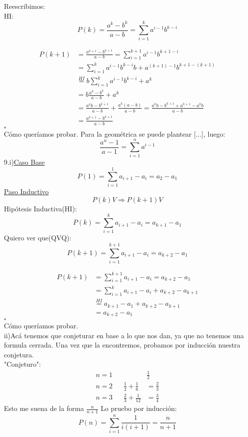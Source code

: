 \documentclass[a4paper,11pt]{article}
\begin{document}
Reescribimos:\\
HI: \[ P(k) = \frac{a^{k} - b^{k}}{a-b} = \sum_{i=1}^{k} a^{i-1}b^{k-i} \]


\begin{equation} 
\begin{split}
P(k+1) & = \frac{a^{k+1} - b^{k+1}}{a-b} = \sum_{i=1}^{k+1}a^{i-1}b^{k+1-i} \\
 &  = \sum_{i=1}^{k}a^{i-1}b^{k-i}b+a^{(k+1)-1}b^{k+1-(k+1)} \\
 & \stackrel{HI}{=} b\sum_{i=1}^{k}a^{i-1}b^{k-i}+a^{k} \\
 & = b \frac{a^{k} - b^{k}}{a-b} +a^{k} \\
 & = \frac{a^{k}b - b^{k+1}}{a-b} +\frac{a^{k}(a-b)}{a-b} = \frac{a^{k}b - b^{k+1}+a^{k+1}-a^{k}b}{a-b} \\
 & = \frac{a^{k+1}- b^{k+1}}{a-b}
\end{split}
\end{equation}
\hfill$\square $\\
Cómo queríamos probar. Para la geométrica se puede plantear [...], luego:\\
 \[ \frac{a^{n} - 1}{a-1} = \sum_{i=1}^{n} a^{i-1} \]
9.i)\underline{Caso Base}\\
\[ P(1) = \sum_{i=1}^{1} a_{i+1}-a_{i} = a_2 - a_1 \]
\underline{Paso Inductivo}\\
\[P(k) V \Rightarrow P(k+1) V\]
Hipótesis Inductiva(HI):\[ P(k) = \sum_{i=1}^{k} a_{i+1}-a_{i} = a_{k+1} - a_1 \]
Quiero ver que(QVQ):\[ P(k+1) = \sum_{i=1}^{k+1} a_{i+1}-a_{i} = a_{k+2} - a_1  \]


\begin{equation}
\begin{split}
P(k+1) & = \sum_{i=1}^{k+1} a_{i+1}-a_{i} = a_{k+2} - a_1 \\
 & = \sum_{i=1}^{k} a_{i+1}-a_{i} + a_{k+2} - a_{k+1}\\
 & \stackrel{HI}{=} a_{k+1} - a_1 + a_{k+2} - a_{k+1} \\
 & = a_{k+2} - a_1
\end{split}
\end{equation}
\hfill$\square $\\
Cómo queríamos probar.\\
ii)Acá tenemos que conjeturar en base a lo que nos dan, ya que no tenemos una formula cerrada. Una vez que la encontremos, probamos por inducción nuestra conjetura.\\
"Conjeturo":\\
\begin{align*}
n=1           &           &  & \frac{1}{2}\\
n=2           &     	  &  \frac{1}{2}+\frac{1}{6}&=\frac{2}{3}\\
n=3           &           &  \frac{2}{3}+\frac{1}{12}&=\frac{3}{4}
\end{align*}
Esto me suena de la forma $\frac{n}{n+1}$ Lo pruebo por inducción:
\[ P(n) = \sum_{i=1}^{n} \frac{1}{i(i+1)} = \frac{n}{n+1} \]
\end{document}
